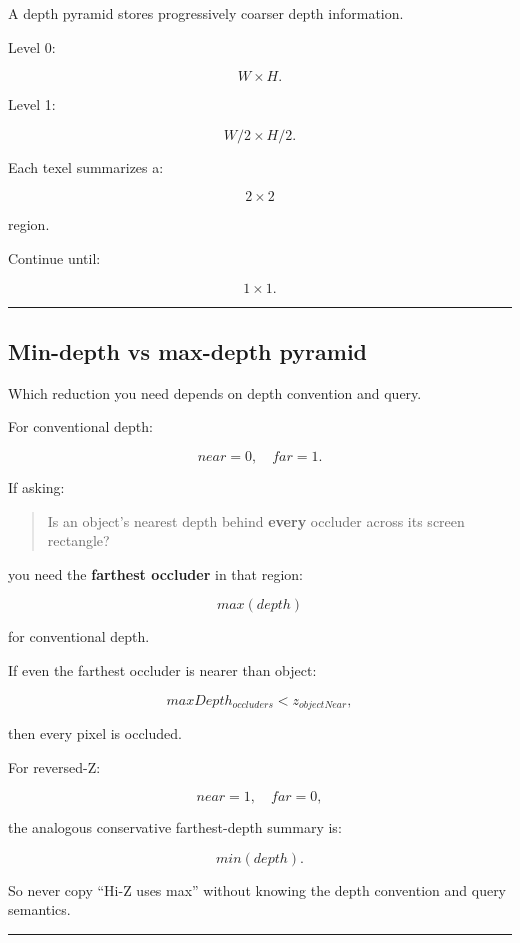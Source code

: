 A depth pyramid stores progressively coarser depth information.

Level 0:

\[
W\times H.
\]

Level 1:

\[
W/2\times H/2.
\]

Each texel summarizes a:

\[
2\times2
\]

region.

Continue until:

\[
1\times1.
\]

\begin{center}\rule{0.5\linewidth}{0.5pt}\end{center}

\subsection{Min-depth vs max-depth pyramid}\label{04-visual-computing-ii-ch040-min-depth-vs-max-depth-pyramid}

Which reduction you need depends on depth convention and query.

For conventional depth:

\[
near=0,\quad far=1.
\]

If asking:

\begin{quote}
Is an object's nearest depth behind \textbf{every} occluder across its screen rectangle?
\end{quote}

you need the \textbf{farthest occluder} in that region:

\[
\boxed{
max(depth)
}
\]

for conventional depth.

If even the farthest occluder is nearer than object:

\[
maxDepth_{occluders}
<
z_{objectNear},
\]

then every pixel is occluded.

For reversed-Z:

\[
near=1,\quad far=0,
\]

the analogous conservative farthest-depth summary is:

\[
\boxed{
min(depth).
}
\]

So never copy ``Hi-Z uses max'' without knowing the depth convention and query semantics.

\begin{center}\rule{0.5\linewidth}{0.5pt}\end{center}

